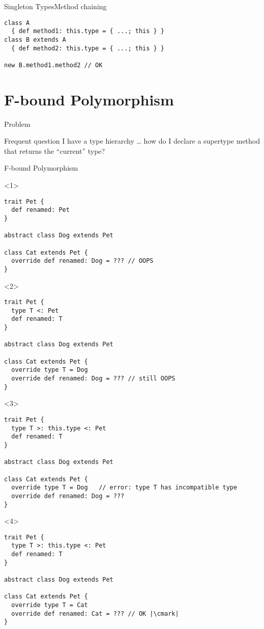 \documentclass[aspectratio=169]{beamer}
\begin{document}
\begin{frame}[fragile]{Singleton Types}{Method chaining}
\begin{verbatim}
class A 
  { def method1: this.type = { ...; this } }
class B extends A 
  { def method2: this.type = { ...; this } }

new B.method1.method2 // OK
\end{verbatim}
\end{frame}

\section{F-bound Polymorphism}
\begin{frame}{Problem}
  \begin{block}{Frequent question}
      I have a type hierarchy … how do I declare a supertype method that returns the “current”
      type?\cite{f-bounds}
  \end{block}
\end{frame}

\begin{frame}[fragile]{F-bound Polymorphism}
\begin{onlyenv}<1>
\begin{verbatim}
trait Pet { 
  def renamed: Pet 
}

abstract class Dog extends Pet

class Cat extends Pet {
  override def renamed: Dog = ??? // OOPS
}
\end{verbatim}
\end{onlyenv}

\begin{onlyenv}<2>
\begin{verbatim}
trait Pet {
  type T <: Pet
  def renamed: T 
}

abstract class Dog extends Pet

class Cat extends Pet {
  override type T = Dog
  override def renamed: Dog = ??? // still OOPS
}
\end{verbatim}
\end{onlyenv}
\begin{onlyenv}<3>
\begin{verbatim}
trait Pet {
  type T >: this.type <: Pet
  def renamed: T 
}

abstract class Dog extends Pet

class Cat extends Pet {
  override type T = Dog   // error: type T has incompatible type
  override def renamed: Dog = ???
}
\end{verbatim}
\end{onlyenv}
\begin{onlyenv}<4>
\begin{verbatim}
trait Pet {
  type T >: this.type <: Pet
  def renamed: T 
}

abstract class Dog extends Pet

class Cat extends Pet {
  override type T = Cat
  override def renamed: Cat = ??? // OK |\cmark|
}
\end{verbatim}
\end{onlyenv}
\end{frame}
\end{document}
